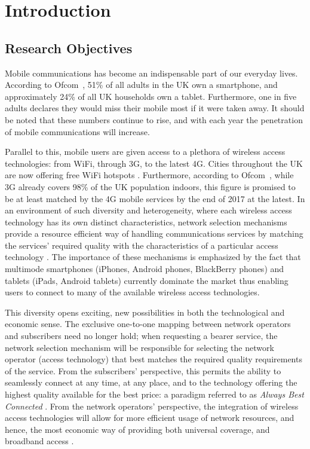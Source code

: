 \chapter{Introduction} %
\label{cha:introduction}

\minitoc
\vspace{10mm}

\section{Research Objectives} %
\label{sec:research_objectives_introduction}
Mobile communications has become an indispensable part of our everyday lives. According to Ofcom~\cite{OfcomReport2013}, 51\% of all adults in the UK own a smartphone, and approximately 24\% of all UK households own a tablet. Furthermore, one in five adults declares they would miss their mobile most if it were taken away. It should be noted that these numbers continue to rise, and with each year the penetration of mobile communications will increase.

Parallel to this, mobile users are given access to a plethora of wireless access technologies: from WiFi, through 3G, to the latest 4G. Cities throughout the UK are now offering free WiFi hotspots \cite{BBCWiFiGlasgow2014}. Furthermore, according to Ofcom~\cite{OfcomLTE2013}, while 3G already covers 98\% of the UK population indoors, this figure is promised to be at least matched by the 4G mobile services by the end of 2017 at the latest. In an environment of such diversity and heterogeneity, where each wireless access technology has its own distinct characteristics, network selection mechanisms provide a resource efficient way of handling communications services by matching the services' required quality with the characteristics of a particular access technology \cite{HossainBeaubrun09}. The importance of these mechanisms is emphasized by the fact that multimode smartphones (iPhones, Android phones, BlackBerry phones) and tablets (iPads, Android tablets) currently dominate the market thus enabling users to connect to many of the available wireless access technologies.

This diversity opens exciting, new possibilities in both the technological and economic sense. The exclusive one-to-one mapping between network operators and subscribers need no longer hold; when requesting a bearer service, the network selection mechanism will be responsible for selecting the network operator (access technology) that best matches the required quality requirements of the service. From the subscribers' perspective, this permits the ability to seamlessly connect at any time, at any place, and to the technology offering the highest quality available for the best price: a paradigm referred to as \emph{Always Best Connected} \cite{ABC03}. From the network operators' perspective, the integration of wireless access technologies will allow for more efficient usage of network resources, and hence, the most economic way of providing both universal coverage, and broadband access \cite{HossainBeaubrun09}.


